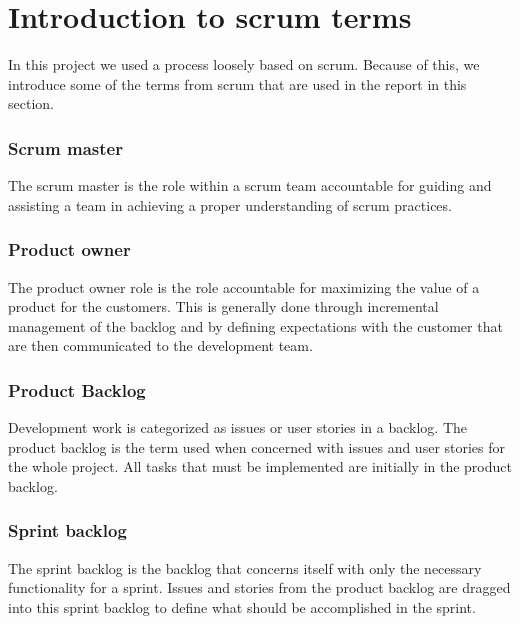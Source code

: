 \section{Introduction to scrum terms}
In this project we used a process loosely based on scrum.
Because of this, we introduce some of the terms from scrum that are used in the report in this section.

\subsubsection{Scrum master}
The scrum master is the role within a scrum team accountable for guiding and assisting a team in achieving a proper understanding of scrum practices\cite{scrumorg}.

\subsubsection{Product owner}
The product owner role is the role accountable for maximizing the value of a product for the customers.
This is generally done through incremental management of the backlog and by defining expectations with the customer that are then communicated to the development team.

\subsubsection{Product Backlog}
Development work is categorized as issues or user stories in a backlog.
The product backlog is the term used when concerned with issues and user stories for the whole project.
All tasks that must be implemented are initially in the product backlog. 

\subsubsection{Sprint backlog}
The sprint backlog is the backlog that concerns itself with only the necessary functionality for a sprint.
Issues and stories from the product backlog are dragged into this sprint backlog to define what should be accomplished in the sprint. 
